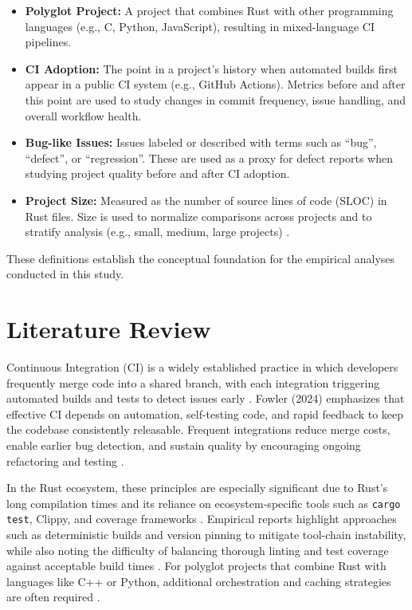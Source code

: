 \documentclass[11pt]{article}
\begin{document}
\begin{itemize}
\item \textbf{Polyglot Project:} A project that combines Rust with other programming languages (e.g., C, Python, JavaScript), resulting in mixed-language CI pipelines.

\item \textbf{CI Adoption:} The point in a project’s history when automated builds first appear in a public CI system (e.g., GitHub Actions). Metrics before and after this point are used to study changes in commit frequency, issue handling, and overall workflow health.

\item \textbf{Bug-like Issues:} Issues labeled or described with terms such as “bug”, “defect”, or “regression”. These are used as a proxy for defect reports when studying project quality before and after CI adoption.

\item \textbf{Project Size:} Measured as the number of source lines of code (SLOC) in Rust files. Size is used to normalize comparisons across projects and to stratify analysis (e.g., small, medium, large projects) \autocite{Bugden2022}.
\end{itemize}
These definitions establish the conceptual foundation for the empirical analyses conducted in this study.

\section{Literature Review}
Continuous Integration (CI) is a widely established practice in which developers frequently merge code into a shared branch, with each integration triggering automated builds and tests to detect issues early \autocite{Fowler2024}. Fowler (2024) emphasizes that effective CI depends on automation, self-testing code, and rapid feedback to keep the codebase consistently releasable. Frequent integrations reduce merge costs, enable earlier bug detection, and sustain quality by encouraging ongoing refactoring and testing \autocite{Fowler2024}.

In the Rust ecosystem, these principles are especially significant due to Rust’s long compilation times and its reliance on ecosystem-specific tools such as \texttt{cargo test}, Clippy, and coverage frameworks \autocite{Mwendia2024}\autocite{HBLAB2025}. Empirical reports highlight approaches such as deterministic builds and version pinning to mitigate tool-chain instability, while also noting the difficulty of balancing thorough linting and test coverage against acceptable build times \autocite{Mwendia2024}. For polyglot projects that combine Rust with languages like C++ or Python, additional orchestration and caching strategies are often required \autocite{HBLAB2025}.
\end{document}
